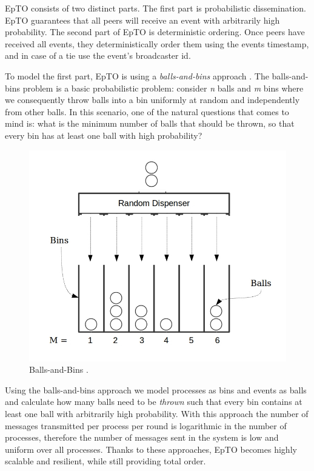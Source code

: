 \documentclass[10pt,conference,a4paper]{IEEEtran}
\begin{document}
EpTO consists of two distinct parts. The first part is probabilistic dissemination. EpTO guarantees that all peers will receive an event with arbitrarily high probability. The second part of EpTO is deterministic ordering. Once peers have received all events, they deterministically order them using the events timestamp, and in case of a tie use the event's broadcaster id.
\par
To model the first part, EpTO is using a \textit{balls-and-bins} approach \autocite{Koldehofe02simplegossiping}. The balls-and-bins problem is a basic probabilistic problem: consider \textit{n} balls and \textit{m} bins where we consequently throw balls into a bin uniformly at random and independently from other balls. In this scenario, one of the natural questions that comes to mind is: what is the minimum number of balls that should be thrown, so that every bin has at least one ball with high probability?
\begin{figure}
\includegraphics[width=\linewidth]{figures/BnB.jpeg}
\caption{Balls-and-Bins \autocite{bnb}.}
\label{fig:balls-and-bins}
\end{figure}
\par
Using the balls-and-bins approach we model processes as bins and events as balls and calculate how many balls need to be \textit{thrown} such that every bin contains at least one ball with arbitrarily high probability. With this approach the number of messages transmitted per process per round is logarithmic in the number of processes, therefore the number of messages sent in the system is low and uniform over all processes. Thanks to these approaches, EpTO becomes highly scalable and resilient, while still providing total order.
\end{document}
